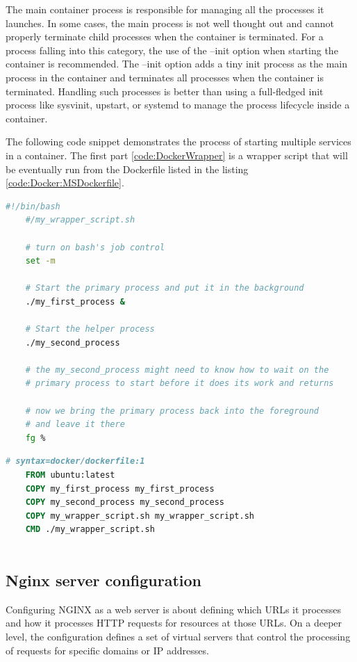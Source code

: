 The main container process is responsible for managing all the processes it launches. In some cases, the main process is not well thought out and cannot properly terminate child processes when the container is terminated. For a process falling into this category, the use of the --init option when starting the container is recommended. The --init option adds a tiny init process as the main process in the container and terminates all processes when the container is terminated. Handling such processes is better than using a full-fledged init process like sysvinit, upstart, or systemd to manage the process lifecycle inside a container.\cite{dockerMultipleService}

The following code snippet demonstrates the process of starting multiple services in a container. The first part \ref{code:DockerWrapper} is a wrapper script that will be eventually run from the Dockerfile listed in the listing \ref{code:Docker:MSDockerfile}.
\begin{lstlisting}[language=bash,
	caption={Wrapper script \cite{dockerMultipleService}}, 
	label={code:DockerWrapper}]
	#!/bin/bash
	#/my_wrapper_script.sh

	# turn on bash's job control
	set -m
	
	# Start the primary process and put it in the background
	./my_first_process &
	
	# Start the helper process
	./my_second_process
	
	# the my_second_process might need to know how to wait on the
	# primary process to start before it does its work and returns
	
	# now we bring the primary process back into the foreground
	# and leave it there
	fg %
\end{lstlisting}

\begin{lstlisting}[language=dockerfile,
	caption={Example Dockerfile for running multiple services \cite{dockerMultipleService}}, 
	label={code:Docker:MSDockerfile}]
	# syntax=docker/dockerfile:1
	FROM ubuntu:latest
	COPY my_first_process my_first_process
	COPY my_second_process my_second_process
	COPY my_wrapper_script.sh my_wrapper_script.sh
	CMD ./my_wrapper_script.sh
	
\end{lstlisting}

\subsection{Nginx server configuration}
\label{Impl:NginxConfig}
Configuring NGINX as a web server is about defining which URLs it processes and how it processes HTTP requests for resources at those URLs. On a deeper level, the configuration defines a set of virtual servers that control the processing of requests for specific domains or IP addresses.

